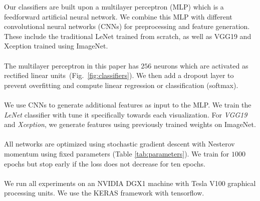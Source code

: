 Our classifiers are built upon a multilayer perceptron (MLP) which is a feedforward artificial neural network. We combine this MLP with different convolutional neural networks (CNNs) for preprocessing and feature generation. These include the traditional LeNet trained from scratch, as well as VGG19 and Xception trained using ImageNet.
\\~\\
 The multilayer perceptron in this paper has $256$ neurons which are activated as rectified linear units~(Fig.~\ref{fig:classifiers}). We then add a dropout layer to prevent overfitting and compute linear regression or classification (softmax).
\\~\\
 We use CNNs to generate additional features as input to the MLP. We train the \emph{LeNet} classifier with tune it specifically towards each visualization. For \emph{VGG19} and \emph{Xception}, we generate features using previously trained weights on ImageNet.
\\~\\
 All networks are optimized using stochastic gradient descent with Nesterov momentum using fixed parameters (Table \ref{tab:parameters}). We train for $1000$ epochs but stop early if the loss does not decrease for ten epochs.
\\~\\
 We run all experiments on an NVIDIA DGX1 machine with Tesla V100 graphical processing units. We use the KERAS framework with tensorflow.

